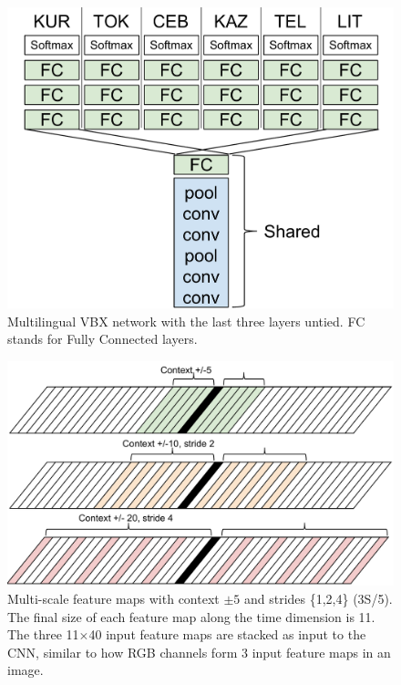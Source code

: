 \documentclass{article}
\begin{document}

\begin{figure}[htp]
    \centering
    \includegraphics[width=0.7\linewidth]{VBX_multiling.pdf}
    \caption{Multilingual VBX network with the last three layers untied. FC stands for Fully Connected layers.}
    \label{fig:multiling}
\end{figure}

\label{ssec:MS}
\begin{figure}[htp]
    \centering
    \includegraphics[width=0.7\linewidth]{multiscale}
    \caption{Multi-scale feature maps with context $\pm5$ and strides \{1,2,4\} (3S/5).
        The final size of each feature map along the time dimension is 11.
    The three 11$\times$40 input feature maps are stacked as input to the CNN, similar to how RGB channels form 
    3 input feature maps in an image.}
    \label{fig:MS_image}
\end{figure}
\end{document}
